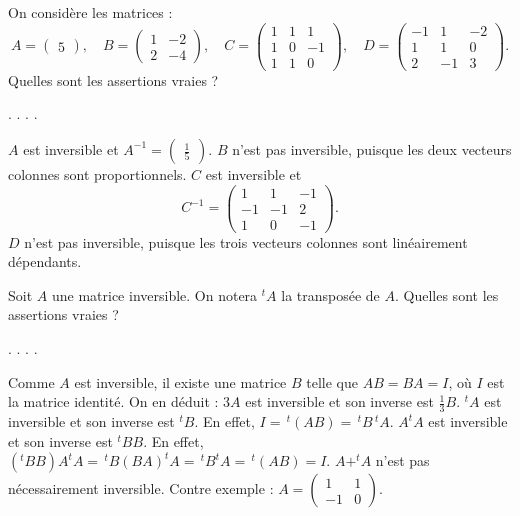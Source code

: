 \begin{question}
On considère les matrices :
$$A=\left(\begin{array}{r} 5 \end{array}\right),\quad B = 
\left(\begin{array}{rc}1&-2\\ 2&-4 \end{array}\right),\quad C = 
\left(\begin{array}{rcc} 1&1&1\\ 1&0&-1\\  1&1&0
\end{array}\right),\quad D =\left(\begin{array}{rcc} -1&1&-2\\ 1&1&0\\ 2&-1&3 \end{array}\right).$$
Quelles sont les assertions vraies ?
\begin{answers}  
.
.
.
.
\end{answers}
\begin{explanations} $A$ est inversible et $A^{-1}=\left(\begin{array}{r}\displaystyle \frac{1}{5}\end{array}\right)$. $B$ n'est pas inversible, puisque les deux vecteurs colonnes sont proportionnels. $C$ est inversible et 
$$C^{-1} = \left(\begin{array}{rcc} 1&1&-1\\-1&-1&2\\ 1&0&-1
\end{array}\right).$$
$D$ n'est pas inversible, puisque les trois vecteurs colonnes sont linéairement dépendants.
\end{explanations}
\end{question}

\begin{question}
Soit $ A$ une matrice inversible. On notera  $^tA$ la transposée de $A$. Quelles sont les assertions vraies ?
\begin{answers}  
.
.
.
.
\end{answers}
\begin{explanations} Comme $A$ est inversible, il existe une matrice $B$ telle que $AB= BA=I$, où $I$ est la matrice identité. On en déduit : $3A$ est inversible et son inverse est $\displaystyle \frac{1}{3}B$.
\vskip0mm
$^tA$ est inversible et son inverse est $ ^tB$. En effet, $I=\, ^t (AB)=\, ^tB\, ^tA$.
\vskip0mm
$A^tA$ est inversible et son inverse est $^tBB$. En effet,  $(^tBB)A^tA=\, ^tB(BA)^tA= \, ^tB^tA=\, ^t (AB)=I$.
\vskip0mm
$A+^tA$ n'est pas nécessairement inversible. Contre exemple : 
$A=\left(\begin{array}{rc} 1&1\\ -1&0 \end{array}\right).$
\end{explanations}
\end{question}

